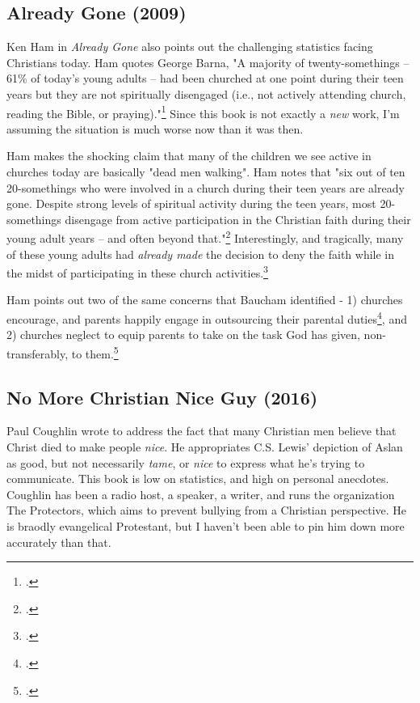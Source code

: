 \subsection{Already Gone (2009)}
Ken Ham in \textit{Already Gone} also points out the challenging statistics facing Christians today.  Ham quotes George Barna, "A majority of twenty-somethings -- 61\% of today's young adults -- had been churched at one point during their teen years but they are not spiritually disengaged (i.e., not actively attending church, reading the Bible, or praying)."\footcite[p. 21]{hamgone}  Since this book is not exactly a \textit{new} work, I'm assuming the situation is much worse now than it was then.  

Ham makes the shocking claim that many of the children we see active in churches today are basically "dead men walking".  Ham notes that "six out of ten 20-somethings who were involved in a church during their teen years are already gone.  Despite strong levels of spiritual activity during the teen years, most 20-somethings disengage from active participation in the Christian faith during their young adult years -- and often beyond that."\footcite[pp. 22-23]{hamgone}   Interestingly, and tragically, many of these young adults had \textit{already made} the decision to deny the faith while in the midst of participating in these church activities.\footcite[p. 32]{hamgone}

Ham points out two of the same concerns that Baucham identified - 1) churches encourage, and parents happily engage in outsourcing their parental duties\footcite[pp. 50-51]{hamgone}, and 2) churches neglect to equip parents to take on the task God has given, non-transferably, to them.\footcite[p. 154]{hamgone}

\subsection{No More Christian Nice Guy (2016)}
Paul Coughlin wrote  to address the fact that many Christian men believe that Christ died to make people \textit{nice}.  He appropriates C.S. Lewis' depiction of Aslan as good, but not necessarily \textit{tame}, or \textit{nice} to express what he's trying to communicate.  This book is low on statistics, and high on personal anecdotes.  Coughlin has been a radio host, a speaker, a writer, and runs the organization The Protectors, which aims to prevent bullying from a Christian perspective.  He is braodly evangelical Protestant, but I haven't been able to pin him down more accurately than that.  

